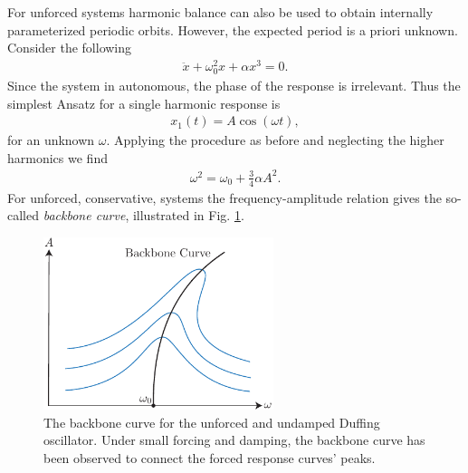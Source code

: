 \begin{ex}
	For unforced systems harmonic balance can also be used to obtain internally parameterized periodic orbits. However, the expected period is a priori unknown. Consider the following
	\begin{align}
		 \ddot{x} + \omega _0^2 x + \alpha x^3 = 0.
	\end{align}
	Since the system in autonomous, the phase of the response is irrelevant. Thus the simplest Ansatz for a single harmonic response is
	\begin{align}
		x_1(t) = A \cos (\omega t),
	\end{align}
	for an unknown $\omega $. Applying the procedure as before and neglecting the higher harmonics we find
	\begin{align}
		\omega^2 = \omega_0 + \frac{3}{4} \alpha A^2.
	\end{align}
	For unforced, conservative, systems the frequency-amplitude relation gives the so-called \emph{backbone curve}, illustrated in Fig. \ref{fig:backbone}.
\begin{figure}[h!]
	\centering
	\includegraphics[width=0.6\textwidth]{figures/ch5/13backbone.pdf}
	\caption{The backbone curve for the unforced and undamped Duffing oscillator. Under small forcing and damping, the backbone curve has been observed to connect the forced response curves' peaks.}
	\label{fig:backbone}
\end{figure}
\end{ex}
